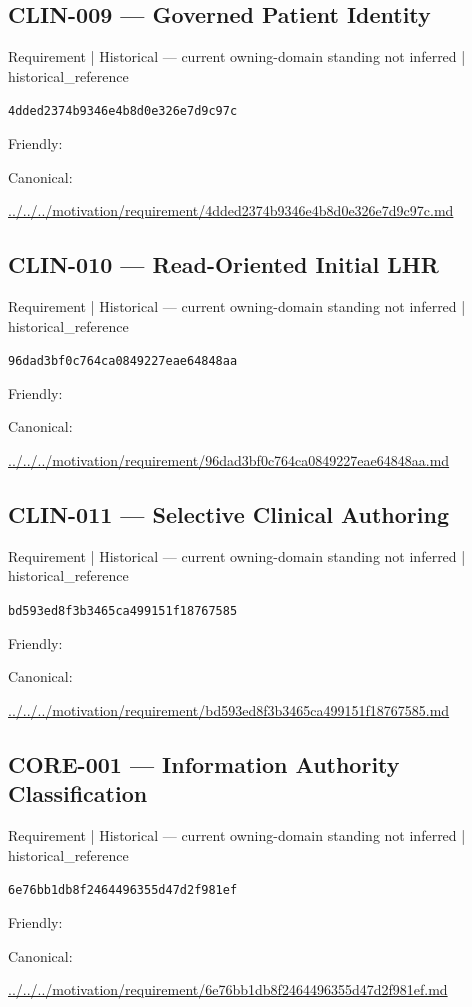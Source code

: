\documentclass[10pt,a4paper]{article}
\begin{document}
\subsection*{CLIN-009 — Governed Patient Identity}
{\small Requirement | Historical — current owning-domain standing not inferred | historical\_reference}\par
\texttt{4dded2374b9346e4b8d0e326e7d9c97c}\par
Friendly: \par
Canonical: \par
{\footnotesize\url{../../../motivation/requirement/4dded2374b9346e4b8d0e326e7d9c97c.md}}\par
\subsection*{CLIN-010 — Read-Oriented Initial LHR}
{\small Requirement | Historical — current owning-domain standing not inferred | historical\_reference}\par
\texttt{96dad3bf0c764ca0849227eae64848aa}\par
Friendly: \par
Canonical: \par
{\footnotesize\url{../../../motivation/requirement/96dad3bf0c764ca0849227eae64848aa.md}}\par
\subsection*{CLIN-011 — Selective Clinical Authoring}
{\small Requirement | Historical — current owning-domain standing not inferred | historical\_reference}\par
\texttt{bd593ed8f3b3465ca499151f18767585}\par
Friendly: \par
Canonical: \par
{\footnotesize\url{../../../motivation/requirement/bd593ed8f3b3465ca499151f18767585.md}}\par
\subsection*{CORE-001 — Information Authority Classification}
{\small Requirement | Historical — current owning-domain standing not inferred | historical\_reference}\par
\texttt{6e76bb1db8f2464496355d47d2f981ef}\par
Friendly: \par
Canonical: \par
{\footnotesize\url{../../../motivation/requirement/6e76bb1db8f2464496355d47d2f981ef.md}}\par
\end{document}
